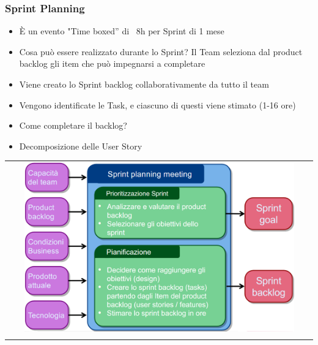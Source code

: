 \subsubsection{Sprint Planning}
\begin{itemize}
    \item È un evento "Time boxed” di ~8h per Sprint di 1 mese
    \item Cosa può essere realizzato durante lo Sprint? Il Team seleziona dal product backlog gli item che può impegnarsi a completare
    \item Viene creato lo Sprint backlog collaborativamente da tutto il team
    \item Vengono identificate le Task, e ciascuno di questi viene stimato (1-16 ore)
    \item Come completare il backlog?
    \item Decomposizione delle User Story
\end{itemize}
\begin{center}
    \begin{tabular}{c}
        \\ \includegraphics[width=0.9\textwidth]{images/Scrum2.png} \\ \\
    \end{tabular}
\end{center}

